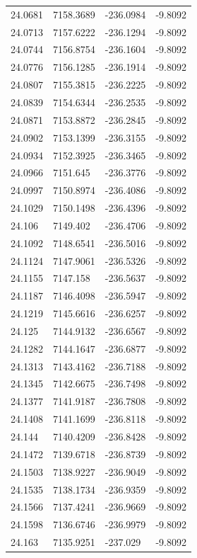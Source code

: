\begin{table}[H]
\begin{tabular}{llll}
24.0681 & 7158.3689 & -236.0984 & -9.8092 \\
24.0713 & 7157.6222 & -236.1294 & -9.8092 \\
24.0744 & 7156.8754 & -236.1604 & -9.8092 \\
24.0776 & 7156.1285 & -236.1914 & -9.8092 \\
24.0807 & 7155.3815 & -236.2225 & -9.8092 \\
24.0839 & 7154.6344 & -236.2535 & -9.8092 \\
24.0871 & 7153.8872 & -236.2845 & -9.8092 \\
24.0902 & 7153.1399 & -236.3155 & -9.8092 \\
24.0934 & 7152.3925 & -236.3465 & -9.8092 \\
24.0966 & 7151.645 & -236.3776 & -9.8092 \\
24.0997 & 7150.8974 & -236.4086 & -9.8092 \\
24.1029 & 7150.1498 & -236.4396 & -9.8092 \\
24.106 & 7149.402 & -236.4706 & -9.8092 \\
24.1092 & 7148.6541 & -236.5016 & -9.8092 \\
24.1124 & 7147.9061 & -236.5326 & -9.8092 \\
24.1155 & 7147.158 & -236.5637 & -9.8092 \\
24.1187 & 7146.4098 & -236.5947 & -9.8092 \\
24.1219 & 7145.6616 & -236.6257 & -9.8092 \\
24.125 & 7144.9132 & -236.6567 & -9.8092 \\
24.1282 & 7144.1647 & -236.6877 & -9.8092 \\
24.1313 & 7143.4162 & -236.7188 & -9.8092 \\
24.1345 & 7142.6675 & -236.7498 & -9.8092 \\
24.1377 & 7141.9187 & -236.7808 & -9.8092 \\
24.1408 & 7141.1699 & -236.8118 & -9.8092 \\
24.144 & 7140.4209 & -236.8428 & -9.8092 \\
24.1472 & 7139.6718 & -236.8739 & -9.8092 \\
24.1503 & 7138.9227 & -236.9049 & -9.8092 \\
24.1535 & 7138.1734 & -236.9359 & -9.8092 \\
24.1566 & 7137.4241 & -236.9669 & -9.8092 \\
24.1598 & 7136.6746 & -236.9979 & -9.8092 \\
24.163 & 7135.9251 & -237.029 & -9.8092 \\

\end{tabular}
\end{table}

